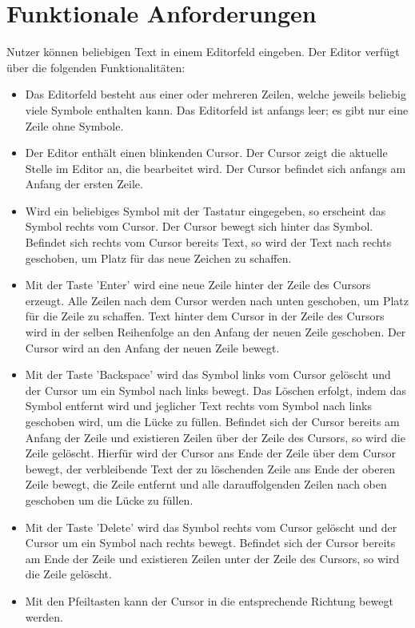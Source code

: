 \documentclass[parskip=full,11pt,twoside]{scrartcl}
\begin{document}
\section{Funktionale Anforderungen}
Nutzer können beliebigen Text in einem Editorfeld eingeben. 
Der Editor verfügt über die folgenden Funktionalitäten:
\begin{itemize}
	\item Das Editorfeld besteht aus einer oder mehreren Zeilen, welche jeweils beliebig viele Symbole enthalten kann. Das Editorfeld ist anfangs leer; es gibt nur eine Zeile ohne Symbole.
	\item Der Editor enthält einen blinkenden Cursor. Der Cursor zeigt die aktuelle Stelle im Editor an, die bearbeitet wird. Der Cursor befindet sich anfangs am Anfang der ersten Zeile.
	\item Wird ein beliebiges Symbol mit der Tastatur eingegeben, so erscheint das Symbol rechts vom Cursor. Der Cursor bewegt sich hinter das Symbol. Befindet sich rechts vom Cursor bereits Text, so wird der Text nach rechts geschoben, um Platz für das neue Zeichen zu schaffen. 
	\item Mit der Taste 'Enter' wird eine neue Zeile hinter der Zeile des Cursors erzeugt. 
	Alle Zeilen nach dem Cursor werden nach unten geschoben, um Platz für die Zeile zu schaffen. 
	Text hinter dem Cursor in der Zeile des Cursors wird in der selben Reihenfolge an den Anfang der neuen Zeile geschoben.
	Der Cursor wird an den Anfang der neuen Zeile bewegt.
	\item Mit der Taste 'Backspace' wird das Symbol links vom Cursor gelöscht und der Cursor um ein Symbol nach links bewegt. 
	Das Löschen erfolgt, indem das Symbol entfernt wird und jeglicher Text rechts vom Symbol nach links geschoben wird, um die Lücke zu füllen.
	Befindet sich der Cursor bereits am Anfang der Zeile und existieren Zeilen über der Zeile des Cursors, so wird die Zeile gelöscht. 
	Hierfür wird der Cursor ans Ende der Zeile über dem Cursor bewegt, der verbleibende Text der zu löschenden Zeile ans Ende der oberen Zeile bewegt, die Zeile entfernt und alle darauffolgenden Zeilen nach oben geschoben um die Lücke zu füllen.
	\item Mit der Taste 'Delete' wird das Symbol rechts vom Cursor gelöscht und der Cursor um ein Symbol nach rechts bewegt.
	Befindet sich der Cursor bereits am Ende der Zeile und existieren Zeilen unter der Zeile des Cursors, so wird die Zeile gelöscht. 
	\item Mit den Pfeiltasten kann der Cursor in die entsprechende Richtung bewegt werden. 

\end{itemize}
\end{document}
